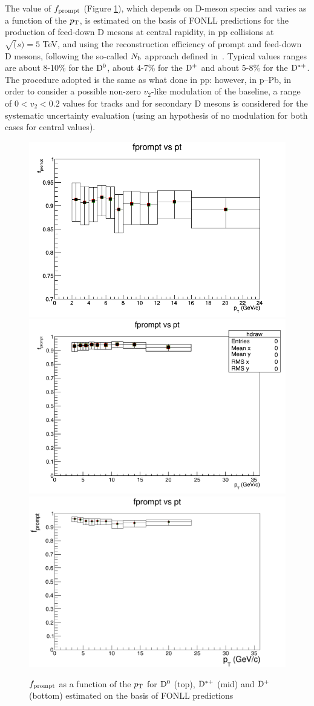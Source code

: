 The value of $f_{\rm prompt}$ (Figure \ref{fprompt}), which depends on D-meson species and varies as a function of the $p_{\rm T}$, is estimated on the basis of FONLL predictions for the production of feed-down D mesons at central rapidity, in pp collisions at $\sqrt(s) = 5$ TeV, and using the reconstruction efficiency of prompt and feed-down D mesons, following the so-called $N_{\rm b}$ approach defined in~\cite{ALICEDmespp7Tev}. Typical values ranges are about 8-10\% for the
${\rm D^0}$, about 4-7\% for the ${\rm D^+}$ and about 5-8\% for the ${\rm D^{*+}}$. The procedure adopted is the same as what done in pp: however, in p--Pb, in order to consider a possible non-zero $v_{2}$-like modulation of the baseline, a range of $0<v_{2}<0.2$ values for tracks and for secondary D mesons is considered for the systematic uncertainty evaluation (using an hypothesis of no modulation for both cases for central values).

\begin{figure}
\centering
\includegraphics[width=0.6\linewidth]{figures/Effs/fprompt_D0.png}
\includegraphics[width=0.6\linewidth]{figures/Effs/fPrompt_Dstar.png}
\includegraphics[width=0.6\linewidth]{figures/Effs/fpromptDplus.png}
\caption{$f_{\rm prompt}$ as a function of the $p_{\rm T}$ for ${\rm D^0}$ (top), ${\rm D^{*+}}$ (mid) and ${\rm D^+}$ (bottom) estimated on the basis of FONLL predictions}
\label{fprompt}
\end{figure}

